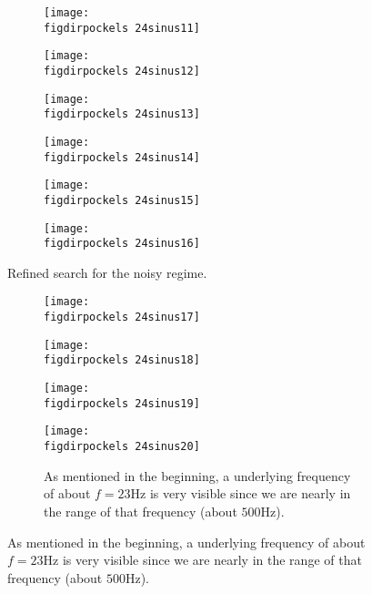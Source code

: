 \begin{figure}
    \begin{subfigure}[b]{\picwidth}
        \texttt{[image: \\figdirpockels 24sinus11]}
        \caption{}
    \end{subfigure}\qquad
    \begin{subfigure}[b]{\picwidth}
        \texttt{[image: \\figdirpockels 24sinus12]}
        \caption{}
    \end{subfigure}
    \begin{subfigure}[b]{\picwidth}
        \texttt{[image: \\figdirpockels 24sinus13]}
        \caption{}
    \end{subfigure}
    \begin{subfigure}[b]{\picwidth}
        \texttt{[image: \\figdirpockels 24sinus14]}
        \caption{}
    \end{subfigure}
    \begin{subfigure}[b]{\picwidth}
        \texttt{[image: \\figdirpockels 24sinus15]}
        \caption{}
    \end{subfigure}
    \begin{subfigure}[b]{\picwidth}
        \texttt{[image: \\figdirpockels 24sinus16]}
        \caption{}
    \end{subfigure}
    \caption{Refined search for the noisy regime.}
    \label{fig:sinus9}
\end{figure}
\begin{figure}
    \begin{subfigure}[b]{\picwidth}
        \texttt{[image: \\figdirpockels 24sinus17]}
        \caption{}
    \end{subfigure}\qquad
    \begin{subfigure}[b]{\picwidth}
        \texttt{[image: \\figdirpockels 24sinus18]}
        \caption{}
    \end{subfigure}
    \begin{subfigure}[b]{\picwidth}
        \texttt{[image: \\figdirpockels 24sinus19]}
        \caption{}
    \end{subfigure}
    \begin{subfigure}[b]{\picwidth}
        \texttt{[image: \\figdirpockels 24sinus20]}
        \caption{As mentioned in the beginning, a underlying
            frequency of about $f=23$Hz is very visible since 
            we are nearly in the range of that frequency (about
                $500$Hz).}
    \end{subfigure}
\label{fig:sinus10}
\end{figure}
\clearpage
